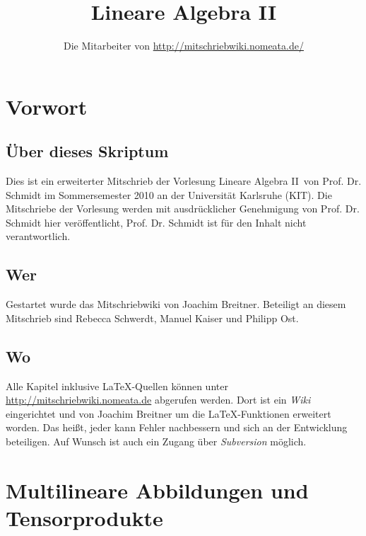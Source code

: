 \documentclass[parskip,a4paper,twoside,DIV15,BCOR12mm]{scrbook}
\author{Die Mitarbeiter von \url{http://mitschriebwiki.nomeata.de/}}
\title{Lineare Algebra II}
\begin{document}
\maketitle

\renewcommand{\thechapter}{\Roman{chapter}}

\tableofcontents

\chapter{Vorwort}

\section{Über dieses Skriptum}
Dies ist ein erweiterter Mitschrieb der Vorlesung \glqq Lineare Algebra II\grqq\ von Prof. Dr. Schmidt im
Sommersemester 2010 an der Universität Karlsruhe (KIT). Die Mitschriebe der Vorlesung werden mit
ausdrücklicher Genehmigung von Prof. Dr. Schmidt hier veröffentlicht, Prof. Dr. Schmidt ist für den
Inhalt nicht verantwortlich.

\section{Wer}
Gestartet wurde das Mitschriebwiki von Joachim Breitner. Beteiligt an diesem Mitschrieb sind
Rebecca Schwerdt, Manuel Kaiser und Philipp Ost.

\section{Wo}
Alle Kapitel inklusive \LaTeX-Quellen können unter \url{http://mitschriebwiki.nomeata.de} abgerufen werden.
Dort ist ein \emph{Wiki} eingerichtet und von Joachim Breitner um die \LaTeX-Funktionen erweitert worden.
Das heißt, jeder kann Fehler nachbessern und sich an der Entwicklung
beteiligen. Auf Wunsch ist auch ein Zugang über \emph{Subversion} möglich.


\renewcommand{\thechapter}{\arabic{chapter}}
\renewcommand{\chaptername}{§}
\setcounter{chapter}{14}

\chapter{Multilineare Abbildungen und Tensorprodukte}
\end{document}
